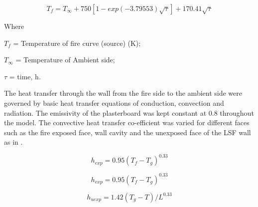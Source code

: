 \begin{equation} \label{eq:sultan1996}
T_f = T_\infty + 750 [1-exp(-3.79553)\sqrt{\tau}] + 170.41\sqrt{\tau}
\end{equation}

Where
\begin{description}[itemsep=0pt,parsep=0pt]
	\item $T_f$ = Temperature of fire curve (source) (\degree K);
	\item $T_\infty$ = Temperature of Ambient side;
	\item $\tau$ = time, h.
\end{description}
The heat transfer through the wall from the fire side to the ambient side were governed by basic heat transfer equations of conduction, convection and radiation. The emissivity of the plasterboard was kept constant at 0.8 throughout the model. The convective heat transfer co-efficient was varied for different faces such as the fire exposed face, wall cavity and the unexposed face of the LSF wall as in .

\begin{equation}\label{eq:hexp}
h_{exp} = 0.95{(T_f - T_g)}^{0.33}
\end{equation}

\begin{equation}\label{eq:hcav}
h_{exp} = 0.95{(T_f - T_g)}^{0.33}
\end{equation}

\begin{equation}\label{eq:huexp}
h_{uexp} = 1.42{(T_g - T)}/L^{0.33}
\end{equation}


